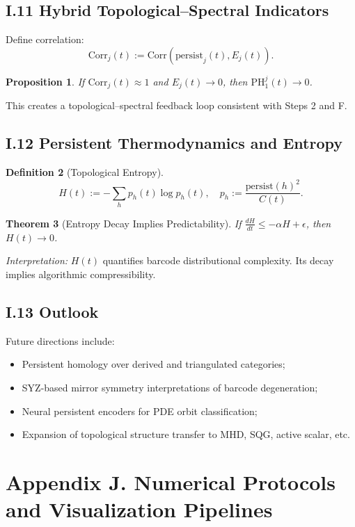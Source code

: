 \documentclass[11pt]{article}
\newtheorem{theorem}{Theorem}[section]
\newtheorem{proposition}[theorem]{Proposition}
\theoremstyle{definition}
\newtheorem{definition}[theorem]{Definition}
\begin{document}
\subsection*{I.11 Hybrid Topological--Spectral Indicators}
Define correlation:
\[
\mathrm{Corr}_j(t) := \mathrm{Corr}(\mathrm{persist}_j(t), E_j(t)).
\]
\begin{proposition}
If $\mathrm{Corr}_j(t) \approx 1$ and $E_j(t) \to 0$, then $\mathrm{PH}_1^j(t) \to 0$.
\end{proposition}
This creates a topological–spectral feedback loop consistent with Steps 2 and F.

\subsection*{I.12 Persistent Thermodynamics and Entropy}
\begin{definition}[Topological Entropy]
\[
H(t) := - \sum_h p_h(t) \log p_h(t), \quad p_h := \frac{\mathrm{persist}(h)^2}{C(t)}.
\]
\end{definition}
\begin{theorem}[Entropy Decay Implies Predictability]
If $\frac{dH}{dt} \leq -\alpha H + \epsilon$, then $H(t) \to 0$.
\end{theorem}
\textit{Interpretation:} $H(t)$ quantifies barcode distributional complexity. Its decay implies algorithmic compressibility.

\subsection*{I.13 Outlook}
Future directions include:
\begin{itemize}
  \item Persistent homology over derived and triangulated categories;
  \item SYZ-based mirror symmetry interpretations of barcode degeneration;
  \item Neural persistent encoders for PDE orbit classification;
  \item Expansion of topological structure transfer to MHD, SQG, active scalar, etc.
\end{itemize}



\section*{Appendix J. Numerical Protocols and Visualization Pipelines}
\label{sec:appendixJ}
\end{document}
